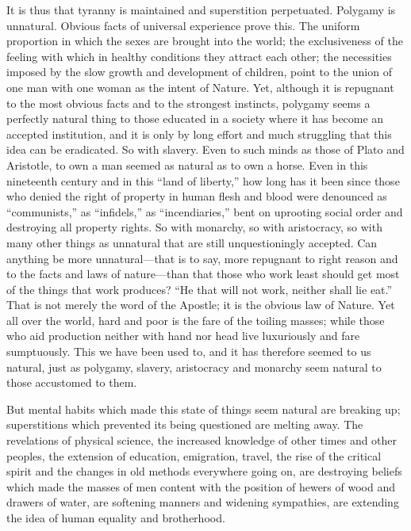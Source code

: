 \documentclass{book}
\begin{document}
It is thus that tyranny is maintained and superstition perpetuated. Polygamy is unnatural. Obvious facts of universal experience prove this. The uniform proportion in which the sexes are brought into the world; the exclusiveness of the feeling with which in healthy conditions they attract each other; the necessities imposed by the slow growth and development of children, point to the union of one man with one woman as the intent of Nature. Yet, although it is repugnant to the most obvious facts and to the strongest instincts, polygamy seems a perfectly natural thing to those educated in a society where it has become an accepted institution, and it is only by long effort and much struggling that this idea can be eradicated. So with slavery. Even to such minds as those of Plato and Aristotle, to own a man seemed as natural as to own a horse. Even in this nineteenth century and in this “land of liberty,” how long has it been since those who denied the right of property in human flesh and blood were denounced as “communists,” as “infidels,” as “incendiaries,” bent on uprooting social order and destroying all property rights. So with monarchy, so with aristocracy, so with many other things as unnatural that are still unquestioningly accepted. Can anything be more unnatural—that is to say, more repugnant to right reason and to the facts and laws of nature—than that those who work least should get most of the things that work produces? “He that will not work, neither shall lie eat.” That is not merely the word of the Apostle; it is the obvious law of Nature. Yet all over the world, hard and poor is the fare of the toiling masses; while those who aid production neither with hand nor head live luxuriously and fare sumptuously. This we have been used to, and it has therefore seemed to us natural, just as polygamy, slavery, aristocracy and monarchy seem natural to those accustomed to them.

But mental habits which made this state of things seem natural are breaking up; superstitions which prevented its being questioned are melting away. The revelations of physical science, the increased knowledge of other times and other peoples, the extension of education, emigration, travel, the rise of the critical spirit and the changes in old methods everywhere going on, are destroying beliefs which made the masses of men content with the position of hewers of wood and drawers of water, are softening manners and widening sympathies, are extending the idea of human equality and brotherhood.
\end{document}
